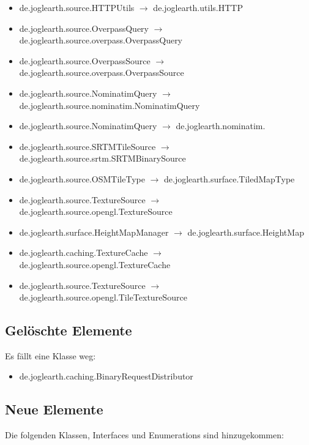 \documentclass[10pt]{scrreprt}
\begin{document}
\begin{itemize}
\item de.joglearth.source.HTTPUtils $ \rightarrow $ de.joglearth.utils.HTTP
\item de.joglearth.source.OverpassQuery $ \rightarrow $ de.joglearth.source.overpass.OverpassQuery
\item de.joglearth.source.OverpassSource $ \rightarrow $ de.joglearth.source.overpass.OverpassSource
\item de.joglearth.source.NominatimQuery $ \rightarrow $ de.joglearth.source.nominatim.NominatimQuery
\item de.joglearth.source.NominatimQuery $ \rightarrow $ de.joglearth.nominatim.
\item de.joglearth.source.SRTMTileSource $ \rightarrow $ de.joglearth.source.srtm.SRTMBinarySource
\item de.joglearth.source.OSMTileType $ \rightarrow $ de.joglearth.surface.TiledMapType
\item de.joglearth.source.TextureSource $ \rightarrow $ de.joglearth.source.opengl.TextureSource
\item de.joglearth.surface.HeightMapManager $ \rightarrow $ de.joglearth.surface.HeightMap
\item de.joglearth.caching.TextureCache $ \rightarrow $ de.joglearth.source.opengl.TextureCache
\item de.joglearth.source.TextureSource $ \rightarrow $ de.joglearth.source.opengl.TileTextureSource
\end{itemize}

\subsection*{Gelöschte Elemente}
Es fällt eine Klasse weg:

\begin{itemize}
\item de.joglearth.caching.BinaryRequestDistributor
\end{itemize}

\subsection*{Neue Elemente}
Die folgenden Klassen, Interfaces und Enumerations sind hinzugekommen:
\end{document}
